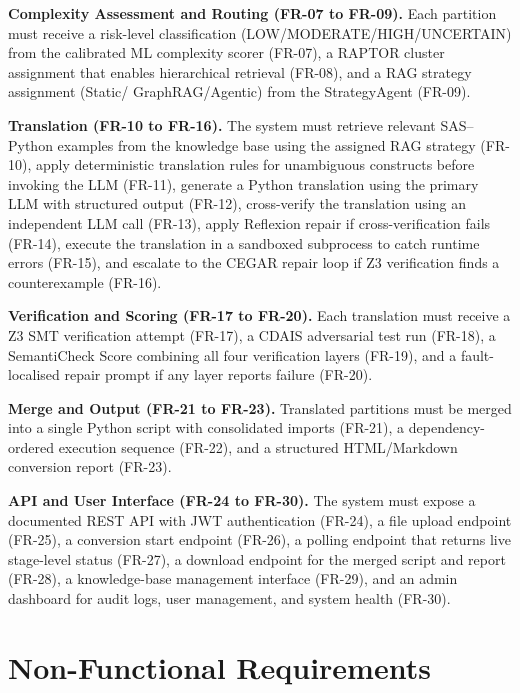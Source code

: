 \textbf{Complexity Assessment and Routing (FR-07 to FR-09).} Each partition
must receive a risk-level classification (LOW/MODERATE/HIGH/UNCERTAIN) from the
calibrated ML complexity scorer (FR-07), a RAPTOR cluster assignment that
enables hierarchical retrieval (FR-08), and a RAG strategy assignment (Static/
GraphRAG/Agentic) from the StrategyAgent (FR-09).

\textbf{Translation (FR-10 to FR-16).} The system must retrieve relevant
SAS--Python examples from the knowledge base using the assigned RAG strategy
(FR-10), apply deterministic translation rules for unambiguous constructs before
invoking the LLM (FR-11), generate a Python translation using the primary LLM
with structured output (FR-12), cross-verify the translation using an
independent LLM call (FR-13), apply Reflexion repair if cross-verification
fails (FR-14), execute the translation in a sandboxed subprocess to catch
runtime errors (FR-15), and escalate to the CEGAR repair loop if Z3
verification finds a counterexample (FR-16).

\textbf{Verification and Scoring (FR-17 to FR-20).} Each translation must
receive a Z3 SMT verification attempt (FR-17), a CDAIS adversarial test run
(FR-18), a SemantiCheck Score combining all four verification layers (FR-19),
and a fault-localised repair prompt if any layer reports failure (FR-20).

\textbf{Merge and Output (FR-21 to FR-23).} Translated partitions must be
merged into a single Python script with consolidated imports (FR-21),
a dependency-ordered execution sequence (FR-22), and a structured HTML/Markdown
conversion report (FR-23).

\textbf{API and User Interface (FR-24 to FR-30).} The system must expose a
documented REST API with JWT authentication (FR-24), a file upload endpoint
(FR-25), a conversion start endpoint (FR-26), a polling endpoint that returns
live stage-level status (FR-27), a download endpoint for the merged script and
report (FR-28), a knowledge-base management interface (FR-29), and an admin
dashboard for audit logs, user management, and system health (FR-30).

\section{Non-Functional Requirements}
\label{sec:nonfunctional-requirements}

